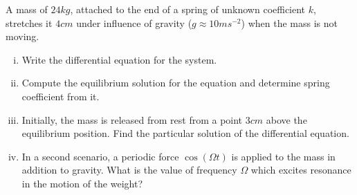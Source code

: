   \begin{question}
    A mass of \(24 \si{kg}\), attached to the end of a spring of unknown coefficient \(k\), stretches it \(4\si{cm}\)
    under influence of gravity (\(g \approx 10 \si{ms^{-2}}\)) when the mass is not moving.
    \begin{enumerate}[(i)]
      \item Write the differential equation for the system.
      \item Compute the equilibrium solution for the equation and determine spring coefficient from it.
      \item Initially, the mass is released from rest from a point \(3 \si{cm}\) above the equilibrium position.
            Find the particular solution of the differential equation.
      \item In a second scenario, a periodic force \(\cos(\Omega t)\) is applied to the mass in addition to gravity.
            What is the value of frequency \(\Omega\) which excites resonance in the motion of the weight?
    \end{enumerate}
  \end{question}


